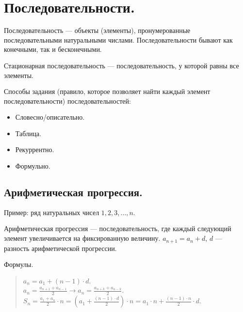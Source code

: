 \documentclass[12pt]{article}
\begin{document}
	\tableofcontents
	\setcounter{tocdepth}{3}
	\newpage
	\section{Последовательности.}
	\begin{definition}
		Последовательность --- объекты (элементы), пронумерованные последовательными натуральными числами. Последовательности бывают как конечными, так и бесконечными.
	\end{definition}
	\begin{definition}
		Стационарная последовательность --- последовательность, у которой равны все элементы.
	\end{definition}
	\begin{note}
		Способы задания (правило, которое позволяет найти каждый элемент последовательности) последовательностей:
		\begin{itemize}
			\item Словесно/описательно.
			\item Таблица.
			\item Рекуррентно.
			\item Формульно.
		\end{itemize}
	\end{note}
	\subsection{Арифметическая прогрессия.}
	Пример: ряд натуральных чисел $1, 2, 3, \dots, n$.
	\begin{definition}
		Арифметическая прогрессия --- последовательность, где каждый следующий элемент увеличивается на фиксированную величину. $a_{n + 1} = a_n + d$, $d$ --- разность арифметической прогрессии.
	\end{definition}
	\begin{statement}
		Формулы.
		\begin{quote}
			$a_n = a_1 + (n - 1) \cdot d$.\\
			$a_n = \frac{a_{n + 1} + a_{n - 1}}{2} \rightarrow a_n = \frac{a_{n + k} + a_{n - k}}{2}$.\\
			$S_n = \frac{a_1 + a_n}{2} \cdot n = (a_1 + \frac{(n - 1) \cdot d}{2}) \cdot n = a_1 \cdot n + \frac{(n - 1) \cdot n}{2} \cdot d$.
		\end{quote}
	\end{statement}
\end{document}
